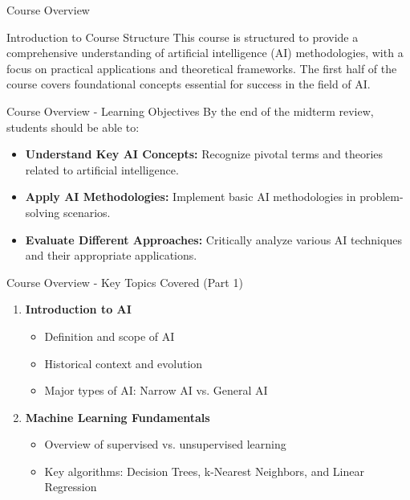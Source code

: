 \documentclass[aspectratio=169]{beamer}
\begin{document}
\begin{frame}[fragile]{Course Overview}
    \begin{block}{Introduction to Course Structure}
        This course is structured to provide a comprehensive understanding of artificial intelligence (AI) methodologies, with a focus on practical applications and theoretical frameworks. 
        The first half of the course covers foundational concepts essential for success in the field of AI.
    \end{block}
\end{frame}

\begin{frame}[fragile]{Course Overview - Learning Objectives}
    By the end of the midterm review, students should be able to:
    \begin{itemize}
        \item \textbf{Understand Key AI Concepts:} Recognize pivotal terms and theories related to artificial intelligence.
        \item \textbf{Apply AI Methodologies:} Implement basic AI methodologies in problem-solving scenarios.
        \item \textbf{Evaluate Different Approaches:} Critically analyze various AI techniques and their appropriate applications.
    \end{itemize}
\end{frame}

\begin{frame}[fragile]{Course Overview - Key Topics Covered (Part 1)}
    \begin{enumerate}
        \item \textbf{Introduction to AI} 
        \begin{itemize}
            \item Definition and scope of AI
            \item Historical context and evolution
            \item Major types of AI: Narrow AI vs. General AI
        \end{itemize}
        \item \textbf{Machine Learning Fundamentals}
        \begin{itemize}
            \item Overview of supervised vs. unsupervised learning
            \item Key algorithms: Decision Trees, k-Nearest Neighbors, and Linear Regression
        \end{itemize}
    \end{enumerate}
\end{frame}
\end{document}
